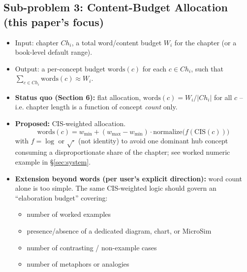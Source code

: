 \subsection{Sub-problem 3: Content-Budget Allocation (this paper's focus)}
\begin{itemize}
    \item Input: chapter $Ch_i$, a total word/content budget $W_i$ for the chapter
          (or a book-level default range).
    \item Output: a per-concept budget $\mathrm{words}(c)$ for each $c \in Ch_i$,
          such that $\sum_{c \in Ch_i} \mathrm{words}(c) \approx W_i$.
    \item \textbf{Status quo (Section 6):} flat allocation,
          $\mathrm{words}(c) = W_i / |Ch_i|$ for all $c$ -- i.e. chapter length is
          a function of concept \emph{count} only.
    \item \textbf{Proposed:} CIS-weighted allocation.
          \[
          \mathrm{words}(c) = w_{\min} + (w_{\max}-w_{\min}) \cdot
          \mathrm{normalize}\big(f(\mathrm{CIS}(c))\big)
          \]
          with $f = \log$ or $\sqrt{\cdot}$ (not identity) to avoid one dominant
          hub concept consuming a disproportionate share of the chapter; see
          worked numeric example in \S\ref{sec:system}.
    \item \textbf{Extension beyond words (per user's explicit direction):} word
          count alone is too simple. The same CIS-weighted logic should govern an
          ``elaboration budget'' covering:
          \begin{itemize}
              \item number of worked examples
              \item presence/absence of a dedicated diagram, chart, or MicroSim
              \item number of contrasting / non-example cases
              \item number of metaphors or analogies
          \end{itemize}
\end{itemize}

